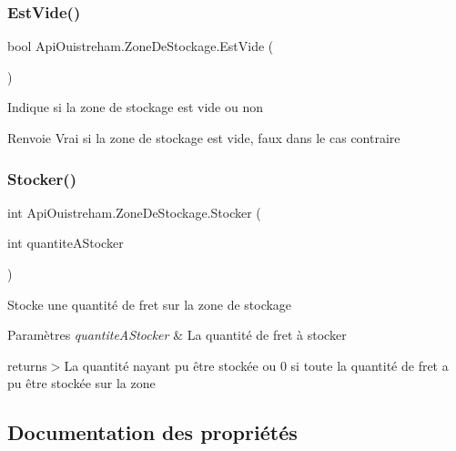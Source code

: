 \subsubsection{\texorpdfstring{Est\+Vide()}{EstVide()}}
{\footnotesize\ttfamily bool Api\+Ouistreham.\+Zone\+De\+Stockage.\+Est\+Vide (\begin{DoxyParamCaption}{ }\end{DoxyParamCaption})}



Indique si la zone de stockage est vide ou non 

\begin{DoxyReturn}{Renvoie}
Vrai si la zone de stockage est vide, faux dans le cas contraire
\end{DoxyReturn}
\mbox{\label{class_api_ouistreham_1_1_zone_de_stockage_a4ae0eac3069a28360611f527471dd443}} 
\subsubsection{\texorpdfstring{Stocker()}{Stocker()}}
{\footnotesize\ttfamily int Api\+Ouistreham.\+Zone\+De\+Stockage.\+Stocker (\begin{DoxyParamCaption}\item[{int}]{quantite\+A\+Stocker }\end{DoxyParamCaption})}



Stocke une quantité de fret sur la zone de stockage 


\begin{DoxyParams}{Paramètres}
{\em quantite\+A\+Stocker} & La quantité de fret à stocker\\
\hline
\end{DoxyParams}
returns$>$La quantité n\textquotesingle{}ayant pu être stockée ou 0 si toute la quantité de fret a pu être stockée sur la zone

\subsection{Documentation des propriétés}
\mbox{\label{class_api_ouistreham_1_1_zone_de_stockage_a3ae400c43899a3c76ce8987f90db2d3b}} 
